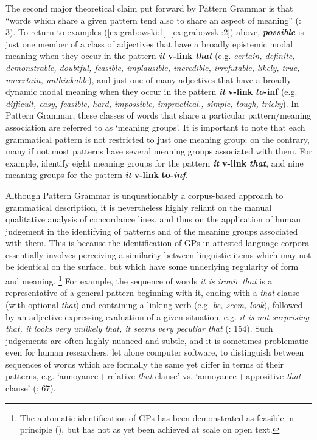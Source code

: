 \documentclass[output=paper]{langscibook}
\begin{document}
\hspace*{-1.75mm}The second major theoretical claim put forward by Pattern Grammar is that “words which share a given pattern tend also to share an aspect of meaning” (\citealt{HunstonFrancis2000}: 3). To return to examples (\ref{ex:grabowski:1}--\ref{ex:grabowski:2}) above, \textbf{\textit{possible}} is just one member of a class of adjectives that have a broadly epistemic modal meaning when they occur in the pattern \textbf{\textit{it}} \textbf{v-link} \textbf{{\ADJ}} \textbf{\textit{that}} (e.g. \textit{certain, definite, demonstrable, doubtful, feasible, implausible, incredible, irrefutable, likely, true, uncertain, unthinkable}), and just one of many adjectives that have a broadly dynamic modal meaning when they occur in the pattern \textbf{\textit{it}} \textbf{v-link} \textbf{{\ADJ}} \textbf{\textit{to}}\textbf{{}-inf} (e.g. \textit{difficult, easy, feasible, hard, impossible, impractical., simple, tough, tricky}). In Pattern Grammar, these classes of words that share a particular pattern/meaning association are referred to as ‘meaning groups’. It is important to note that each grammatical pattern is not restricted to just one meaning group; on the contrary, many if not most patterns have several meaning groups associated with them. For example, \citet{FrancisEtAl1998} identify eight meaning groups for the pattern \textbf{\textit{it}} \textbf{v-link} \textbf{{\ADJ}} \textbf{\textit{that}}, and nine meaning groups for the pattern \textbf{\textit{it}} \textbf{v-link} \textbf{{\ADJ}} \textbf{to-\textit{inf}}.

\hspace*{-1.75mm}Although Pattern Grammar is unquestionably a corpus-based approach to grammatical description, it is nevertheless highly reliant on the manual qualitative analysis of concordance lines, and thus on the application of human judgement in the identifying of patterns and of the meaning groups associated with them. This is because the identification of GPs in attested language corpora essentially involves perceiving a similarity between linguistic items which may not be identical on the surface, but which have some underlying regularity of form and meaning. \footnote{The automatic identification of GPs has been demonstrated as feasible in principle (\citealt{MasonHunston2004}), but has not as yet been achieved at scale on open text.} For example, the sequence of words \textit{it is ironic that} is a representative of a general pattern beginning with it, ending with a \textit{that}{}-clause (with optional \textit{that}) and containing a linking verb (e.g. \textit{be, seem, look}), followed by an adjective expressing evaluation of a given situation, e.g. \textit{it is not surprising that, it looks very unlikely that, it seems very peculiar that} (\citealt{HunstonFrancis2000}: 154). Such judgements are often highly nuanced and subtle, and it is sometimes problematic even for human researchers, let alone computer software, to distinguish between sequences of words which are formally the same yet differ in terms of their patterns, e.g. ‘annoyance\,+\,relative \textit{that}-clause’ vs. ‘annoyance\,+\,appositive \textit{that}-clause’ (\citealt{HunstonFrancis2000}: 67).
\end{document}
